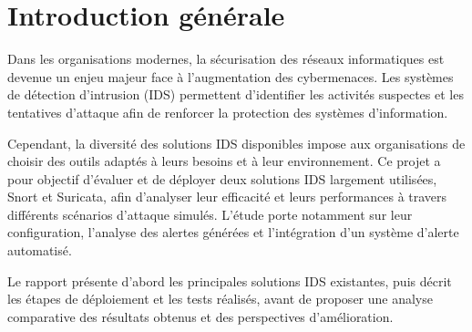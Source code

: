 \section{Introduction générale}
Dans les organisations modernes, la sécurisation des réseaux informatiques est devenue un enjeu majeur face à l'augmentation des cybermenaces. Les systèmes de détection d'intrusion (IDS) permettent d'identifier les activités suspectes et les tentatives d'attaque afin de renforcer la protection des systèmes d'information.

Cependant, la diversité des solutions IDS disponibles impose aux organisations de choisir des outils adaptés à leurs besoins et à leur environnement. Ce projet a pour objectif d'évaluer et de déployer deux solutions IDS largement utilisées, Snort et Suricata, afin d'analyser leur efficacité et leurs performances à travers différents scénarios d'attaque simulés. L'étude porte notamment sur leur configuration, l'analyse des alertes générées et l'intégration d'un système d'alerte automatisé.

Le rapport présente d'abord les principales solutions IDS existantes, puis décrit les étapes de déploiement et les tests réalisés, avant de proposer une analyse comparative des résultats obtenus et des perspectives d'amélioration.
